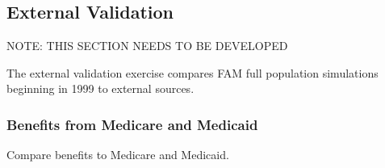 \subsection{External Validation}
NOTE: THIS SECTION NEEDS TO BE DEVELOPED

The external validation exercise compares FAM full population simulations beginning in 1999 to external sources.  


\subsubsection{Benefits from Medicare and Medicaid}

Compare benefits to Medicare and Medicaid.